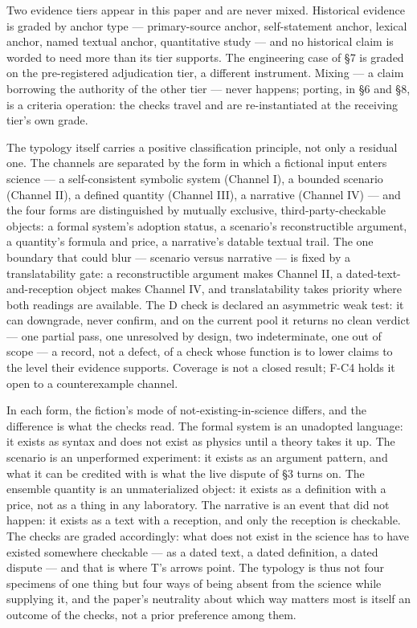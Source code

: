 \documentclass[11pt,a4paper]{article}
\begin{document}
Two evidence tiers appear in this paper and are never mixed. Historical evidence is graded by anchor type — primary-source anchor, self-statement anchor, lexical anchor, named textual anchor, quantitative study — and no historical claim is worded to need more than its tier supports. The engineering case of §7 is graded on the pre-registered adjudication tier, a different instrument. Mixing — a claim borrowing the authority of the other tier — never happens; porting, in §6 and §8, is a criteria operation: the checks travel and are re-instantiated at the receiving tier's own grade.

The typology itself carries a positive classification principle, not only a residual one. The channels are separated by the form in which a fictional input enters science — a self-consistent symbolic system (Channel I), a bounded scenario (Channel II), a defined quantity (Channel III), a narrative (Channel IV) — and the four forms are distinguished by mutually exclusive, third-party-checkable objects: a formal system's adoption status, a scenario's reconstructible argument, a quantity's formula and price, a narrative's datable textual trail. The one boundary that could blur — scenario versus narrative — is fixed by a translatability gate: a reconstructible argument makes Channel II, a dated-text-and-reception object makes Channel IV, and translatability takes priority where both readings are available. The D check is declared an asymmetric weak test: it can downgrade, never confirm, and on the current pool it returns no clean verdict — one partial pass, one unresolved by design, two indeterminate, one out of scope — a record, not a defect, of a check whose function is to lower claims to the level their evidence supports. Coverage is not a closed result; F-C4 holds it open to a counterexample channel.

In each form, the fiction's mode of not-existing-in-science differs, and the difference is what the checks read. The formal system is an unadopted language: it exists as syntax and does not exist as physics until a theory takes it up. The scenario is an unperformed experiment: it exists as an argument pattern, and what it can be credited with is what the live dispute of \S3 turns on. The ensemble quantity is an unmaterialized object: it exists as a definition with a price, not as a thing in any laboratory. The narrative is an event that did not happen: it exists as a text with a reception, and only the reception is checkable. The checks are graded accordingly: what does not exist in the science has to have existed somewhere checkable --- as a dated text, a dated definition, a dated dispute --- and that is where T's arrows point. The typology is thus not four specimens of one thing but four ways of being absent from the science while supplying it, and the paper's neutrality about which way matters most is itself an outcome of the checks, not a prior preference among them.
\end{document}
